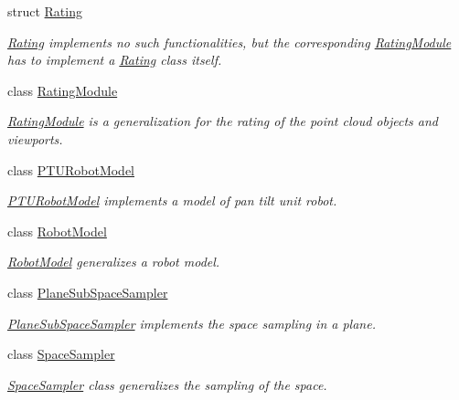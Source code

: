 \begin{DoxyCompactItemize}
struct \hyperlink{structnext__best__view_1_1Rating}{\-Rating}
\begin{DoxyCompactList}\small\item\em \hyperlink{structnext__best__view_1_1Rating}{\-Rating} implements no such functionalities, but the corresponding \hyperlink{classnext__best__view_1_1RatingModule}{\-Rating\-Module} has to implement a \hyperlink{structnext__best__view_1_1Rating}{\-Rating} class itself. \end{DoxyCompactList}\item 
class \hyperlink{classnext__best__view_1_1RatingModule}{\-Rating\-Module}
\begin{DoxyCompactList}\small\item\em \hyperlink{classnext__best__view_1_1RatingModule}{\-Rating\-Module} is a generalization for the rating of the point cloud objects and viewports. \end{DoxyCompactList}\item 
class \hyperlink{classnext__best__view_1_1PTURobotModel}{\-P\-T\-U\-Robot\-Model}
\begin{DoxyCompactList}\small\item\em \hyperlink{classnext__best__view_1_1PTURobotModel}{\-P\-T\-U\-Robot\-Model} implements a model of pan tilt unit robot. \end{DoxyCompactList}\item 
class \hyperlink{classnext__best__view_1_1RobotModel}{\-Robot\-Model}
\begin{DoxyCompactList}\small\item\em \hyperlink{classnext__best__view_1_1RobotModel}{\-Robot\-Model} generalizes a robot model. \end{DoxyCompactList}\item 
class \hyperlink{classnext__best__view_1_1PlaneSubSpaceSampler}{\-Plane\-Sub\-Space\-Sampler}
\begin{DoxyCompactList}\small\item\em \hyperlink{classnext__best__view_1_1PlaneSubSpaceSampler}{\-Plane\-Sub\-Space\-Sampler} implements the space sampling in a plane. \end{DoxyCompactList}\item 
class \hyperlink{classnext__best__view_1_1SpaceSampler}{\-Space\-Sampler}
\begin{DoxyCompactList}\small\item\em \hyperlink{classnext__best__view_1_1SpaceSampler}{\-Space\-Sampler} class generalizes the sampling of the space. \end{DoxyCompactList}\item 

\end{DoxyCompactItemize}
